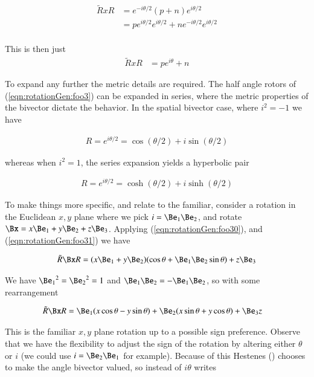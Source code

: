 \begin{align*}
\tilde{R} x R 
&=
e^{-i \theta/2} (p + n) e^{i \theta/2} \\
&=
p e^{i \theta/2} e^{i \theta/2} 
+ 
n e^{-i \theta/2} e^{i \theta/2} \\
\end{align*}

This is then just
\begin{align}\label{eqn:rotationGen:foo30}
\tilde{R} x R 
&=
p e^{i \theta} + n 
\end{align}

To expand any further the metric details are required.  The half angle rotors of (\ref{eqn:rotationGen:foo3}) can be expanded in series, where the metric properties of the bivector dictate the behavior.  In the spatial bivector case, where $i^2 = -1$ we have

\begin{align}\label{eqn:rotationGen:foo31}
R = e^{i \theta/2} = \cos(\theta/2) + i\sin(\theta/2)
\end{align}

whereas when $i^2 = 1$, the series expansion yields a hyperbolic pair

\begin{align}\label{eqn:rotationGen:foo32}
R = e^{i \theta/2} = \cosh(\theta/2) + i\sinh(\theta/2)
\end{align}

To make things more specific, and relate to the familiar, consider a rotation in the Euclidean $x,y$ plane where we pick $i = \Be_1 \Be_2$, and rotate $\Bx = x \Be_1 + y \Be_2 + z \Be_3$.  Applying (\ref{eqn:rotationGen:foo30}), and (\ref{eqn:rotationGen:foo31}) we have

\begin{align*}
\tilde{R} \Bx R 
&=
(x \Be_1 + y \Be_2) (\cos\theta + \Be_1 \Be_2 \sin\theta) + z \Be_3 \\
\end{align*}

We have ${\Be_1}^2 = {\Be_2}^2 = 1$ and $\Be_1 \Be_2 = -\Be_1 \Be_2$, so with some rearrangement

\begin{align*}
\tilde{R} \Bx R 
&=
\Be_1 (x \cos\theta - y \sin\theta )
+\Be_2 (x \sin\theta + y \cos\theta )
+ \Be_3 z
\end{align*}

This is the familiar $x,y$ plane rotation up to a possible sign preference.  Observe that we have the flexibility to adjust the sign of the rotation by altering either $\theta$ or $i$ (we could use $i = \Be_2 \Be_1$ for example).  Because of this Hestenes (\citep{hestenes1999nfc}) chooses to make the angle bivector valued, so instead of $i\theta$ writes

